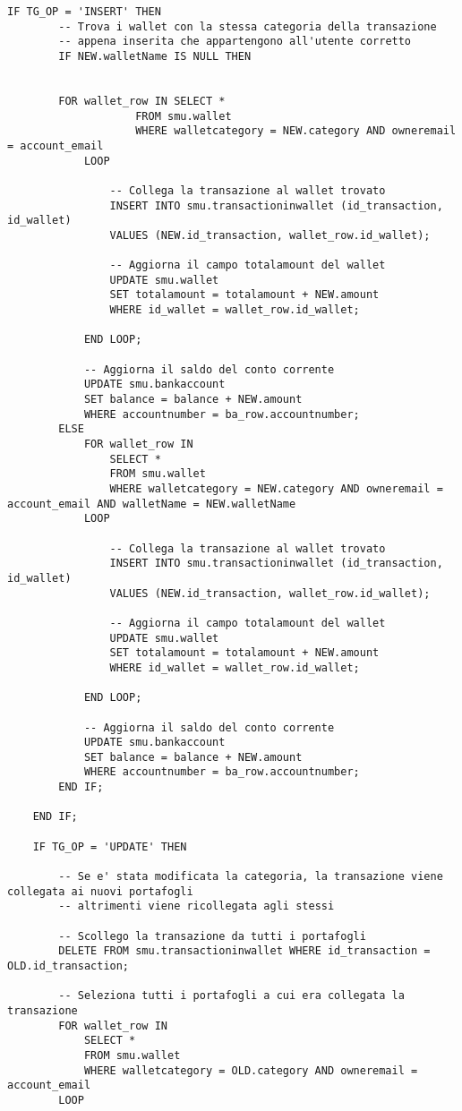 \begin{lstlisting}[tabsize=2]
    IF TG_OP = 'INSERT' THEN
        -- Trova i wallet con la stessa categoria della transazione
        -- appena inserita che appartengono all'utente corretto
		IF NEW.walletName IS NULL THEN
			

        FOR wallet_row IN SELECT *
				    FROM smu.wallet
				    WHERE walletcategory = NEW.category AND owneremail = account_email
			LOOP

				-- Collega la transazione al wallet trovato
				INSERT INTO smu.transactioninwallet (id_transaction, id_wallet)
				VALUES (NEW.id_transaction, wallet_row.id_wallet);

				-- Aggiorna il campo totalamount del wallet
				UPDATE smu.wallet
				SET totalamount = totalamount + NEW.amount
				WHERE id_wallet = wallet_row.id_wallet;

			END LOOP;

			-- Aggiorna il saldo del conto corrente
			UPDATE smu.bankaccount
			SET balance = balance + NEW.amount
			WHERE accountnumber = ba_row.accountnumber;
		ELSE
			FOR wallet_row IN
				SELECT *
				FROM smu.wallet
				WHERE walletcategory = NEW.category AND owneremail = account_email AND walletName = NEW.walletName
			LOOP

				-- Collega la transazione al wallet trovato
				INSERT INTO smu.transactioninwallet (id_transaction, id_wallet)
				VALUES (NEW.id_transaction, wallet_row.id_wallet);

				-- Aggiorna il campo totalamount del wallet
				UPDATE smu.wallet
				SET totalamount = totalamount + NEW.amount
				WHERE id_wallet = wallet_row.id_wallet;

			END LOOP;

			-- Aggiorna il saldo del conto corrente
			UPDATE smu.bankaccount
			SET balance = balance + NEW.amount
			WHERE accountnumber = ba_row.accountnumber;
		END IF;

    END IF;

    IF TG_OP = 'UPDATE' THEN

        -- Se e' stata modificata la categoria, la transazione viene collegata ai nuovi portafogli
        -- altrimenti viene ricollegata agli stessi

        -- Scollego la transazione da tutti i portafogli
        DELETE FROM smu.transactioninwallet WHERE id_transaction = OLD.id_transaction;
        
        -- Seleziona tutti i portafogli a cui era collegata la transazione
        FOR wallet_row IN
            SELECT *
            FROM smu.wallet
            WHERE walletcategory = OLD.category AND owneremail = account_email
        LOOP


\end{lstlisting}
